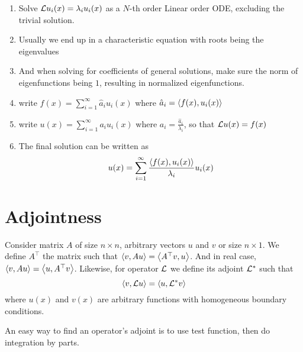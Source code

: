 \documentclass{article}
\begin{document}
\begin{enumerate}
    \item Solve \(\mathcal{L} u_i(x) = \lambda_i u_i(x)\) as a \(N\)-th order Linear order ODE,  excluding the trivial solution.
    \item Usually we end up in a characteristic equation with roots being the eigenvalues
    \item And when solving for coefficients of general solutions, make sure the norm of eigenfunctions being \(1\), resulting in normalized eigenfunctions.
    \item write \(f(x) = \sum_{i=1}^\infty \hat a_i u_i(x)\) where \(\hat a_i=\left \langle f(x),u_i(x) \right \rangle\)
    \item write \(u(x) = \sum_{i=1}^\infty  a_i u_i(x)\) where \(a_i = \frac{\hat a_i}{\lambda_i}\), so that \(\mathcal{L} u(x)=f(x)\)
    \item The final solution can be written as 
    \[u(x) = \sum_{i=1}^\infty \frac{\left \langle f(x),u_i(x) \right \rangle}{\lambda_i} u_i(x)\]
\end{enumerate}

\section{Adjointness}

\begin{definition}
    Consider matrix \(A\) of size \(n\times n\), arbitrary vectors \(u\) and \(v\) or size \(n\times 1\). We define \(A^\top\) the matrix such that \(\left \langle v,Au \right \rangle=\left \langle A^\top v, u \right \rangle\). And in real case, \(\left \langle v,Au \right \rangle=\left \langle u, A^\top v \right \rangle\). Likewise, for operator \(\mathcal{L}\) we define its adjoint \(\mathcal{L}^*\) such that 
    \[\left \langle v,\mathcal{L} u \right \rangle = \left \langle u,\mathcal{L}^* v \right \rangle\]
    where \(u(x)\) and \(v(x)\) are arbitrary functions with homogeneous boundary conditions.
\end{definition}

\begin{remark}
    An easy way to find an operator's adjoint is to use test function, then do integration by parts.
\end{remark}
\end{document}
